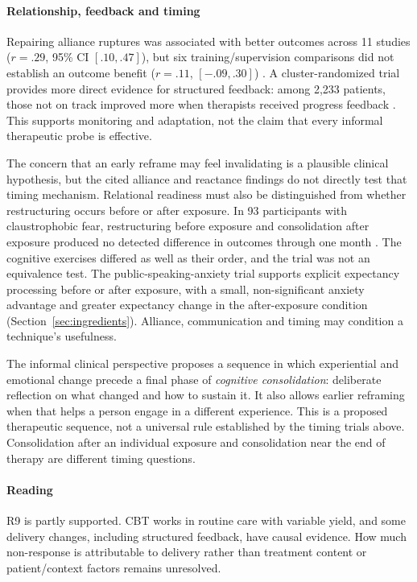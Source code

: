 \paragraph{Relationship, feedback and timing}
Repairing alliance ruptures was associated with better outcomes across 11 studies ($r=.29$, 95\% CI $[.10,.47]$), but six training/supervision comparisons did not establish an outcome benefit ($r=.11$, $[-.09,.30]$) \citep{eubanks2018rupture}.
A cluster-randomized trial provides more direct evidence for structured feedback: among 2,233 patients, those not on track improved more when therapists received progress feedback \citep{Delgadillo2018Feedback}.
This supports monitoring and adaptation, not the claim that every informal therapeutic probe is effective.

The concern that an early reframe may feel invalidating is a plausible clinical hypothesis, but the cited alliance and reactance findings do not directly test that timing mechanism.
Relational readiness must also be distinguished from whether restructuring occurs before or after exposure.
In 93 participants with claustrophobic fear, restructuring before exposure and consolidation after exposure produced no detected difference in outcomes through one month \citep{krause2022claustrophobia}.
The cognitive exercises differed as well as their order, and the trial was not an equivalence test.
The public-speaking-anxiety trial supports explicit expectancy processing before or after exposure, with a small, non-significant anxiety advantage and greater expectancy change in the after-exposure condition (Section~\ref{sec:ingredients}).
Alliance, communication and timing may condition a technique's usefulness.

The informal clinical perspective proposes a sequence in which experiential and emotional change precede a final phase of \emph{cognitive consolidation}: deliberate reflection on what changed and how to sustain it.
It also allows earlier reframing when that helps a person engage in a different experience.
This is a proposed therapeutic sequence, not a universal rule established by the timing trials above.
Consolidation after an individual exposure and consolidation near the end of therapy are different timing questions.

\paragraph{Reading} R9 is partly supported.
CBT works in routine care with variable yield, and some delivery changes, including structured feedback, have causal evidence.
How much non-response is attributable to delivery rather than treatment content or patient/context factors remains unresolved.
